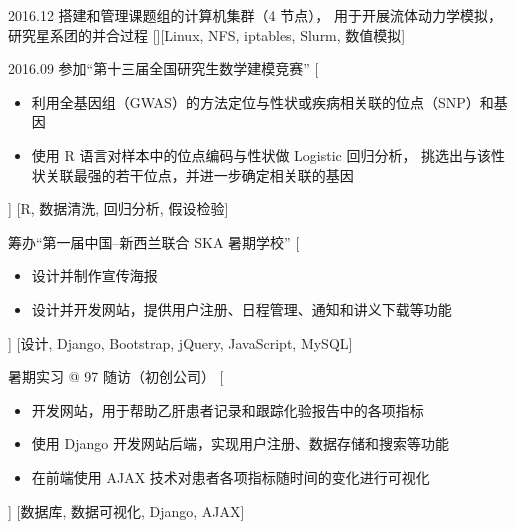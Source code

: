 \documentclass[zh]{resume}
\begin{document}
\begin{experiences}
  \separator{0.5em}
  \experience
    {2016.12}%
    {搭建和管理课题组的计算机集群（4 节点），
      用于开展流体动力学模拟，研究星系团的并合过程}%
    [][Linux, NFS, iptables, Slurm, 数值模拟]


  \separator{0.5em}
  \experience
    {2016.09}%
    {参加\enquote{第十三届全国研究生数学建模竞赛}}%
    [\begin{itemize}
      \item 利用全基因组（GWAS）的方法定位与性状或疾病相关联的位点（SNP）和基因
      \item 使用 R 语言对样本中的位点编码与性状做 Logistic 回归分析，
            挑选出与该性状关联最强的若干位点，并进一步确定相关联的基因
    \end{itemize}]%
    [R, 数据清洗, 回归分析, 假设检验]

  \separator{0.5em}
    {筹办\enquote{第一届中国--新西兰联合 SKA 暑期学校}}%
    [\begin{itemize}
      \item 设计并制作宣传海报
      \item 设计并开发网站，提供用户注册、日程管理、通知和讲义下载等功能
    \end{itemize}]%
    [设计, Django, Bootstrap, jQuery, JavaScript, MySQL]

  \separator{0.5em}
    {暑期实习 @ 97 随访（初创公司）}%
    [\begin{itemize}
      \item 开发网站，用于帮助乙肝患者记录和跟踪化验报告中的各项指标
      \item 使用 Django 开发网站后端，实现用户注册、数据存储和搜索等功能
      \item 在前端使用 AJAX 技术对患者各项指标随时间的变化进行可视化
    \end{itemize}]%
    [数据库, 数据可视化, Django, AJAX]

\end{experiences}
\end{document}
